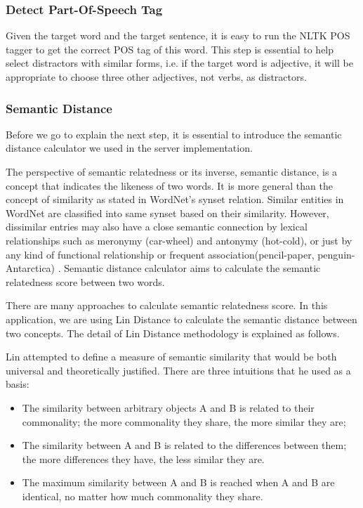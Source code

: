 \subsubsection{Detect Part-Of-Speech Tag}
Given the target word and the target sentence, it is easy to run the NLTK POS tagger to get the correct POS tag of this word. This step is essential to help select distractors with similar forms, i.e. if the target word is adjective, it will be appropriate to choose three other adjectives, not verbs, as distractors.

\subsubsection{Semantic Distance}
Before we go to explain the next step, it is essential to introduce the semantic distance calculator we used in the server implementation. 

The perspective of semantic relatedness or its inverse, semantic distance, is a concept that indicates the likeness of two words. It is more general than the concept of similarity as stated in WordNet’s synset relation. Similar entities in WordNet are classified into same synset based on their similarity. However, dissimilar entries may also have a close semantic connection by lexical relationships  such as meronymy (car-wheel) and antonymy (hot-cold), or just by any kind of functional relationship or frequent association(pencil-paper, penguin-Antarctica) \cite{ale01}. Semantic distance calculator aims to calculate the semantic relatedness score between two words.

There are many approaches to calculate semantic relatedness score. In this application, we are using Lin Distance \cite{lin98} to calculate the semantic distance between two concepts. The detail of Lin Distance methodology is explained as follows.

Lin attempted to define a measure of semantic similarity that would be both universal and theoretically justified. There are three intuitions that he used as a basis:
\begin{itemize}
\item The similarity between arbitrary objects A and B is related to their commonality; the more commonality they share, the more similar they are;
\item The similarity between A and B is related to the differences between them; the more differences they have, the less similar they are.
\item The maximum similarity between A and B is reached when A and B are identical, no matter how much commonality they share. 
\end{itemize}

